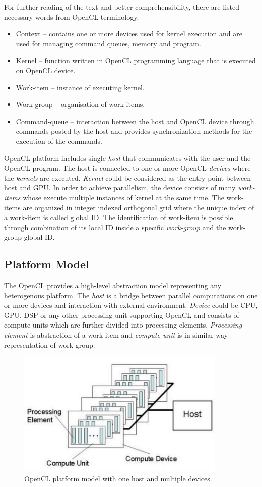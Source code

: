 For further reading of the text and better comprehensibility, there are
listed necessary words from OpenCL terminology\cite{opencl}.
\begin{itemize}
\item Context -- contains one or more devices used for kernel execution
and are used for managing command queues, memory and program.
\item Kernel -- function written in OpenCL programming language that 
is executed on OpenCL device. 
\item Work-item -- instance of executing kernel. 
\item Work-group -- organisation of work-items. 
\item Command-queue -- interaction between the host and OpenCL
device through commands posted by the host and provides synchronization
methods for the execution of the commands.
\end{itemize}

OpenCL platform includes single \textit{host} that communicates with the user
and the OpenCL program. The host is connected to one or more
OpenCL \textit{devices} where the \textit{kernels} are executed. 
\textit{Kernel} could be considered as the entry point between host and
GPU. In order to achieve parallelism, the device consists of many 
\textit{work-items} whose execute multiple instances of kernel at the same 
time. The work-items are organized in integer indexed orthogonal grid where 
the unique index of a work-item is called global ID. The identification
of work-item is possible through combination of its local ID inside a specific
\textit{work-group} and the work-group global ID.

\subsection{Platform Model}
The OpenCL provides a high-level abstraction model representing any heterogenous
platform. The \textit{host} is a bridge between parallel computations on one or
more devices and interaction with external environment. \textit{Device} could be
CPU, GPU, DSP or any other processing unit supporting OpenCL and consists
of compute units which are further divided into processing elements. 
\textit{Processing element} is abstraction of a work-item and 
\textit{compute unit} is in similar way representation of work-group.

\begin{figure}[H]
\centering
\includegraphics[width=10cm]{fig/opencl_platform_model.jpg}
\caption{OpenCL platform model with one host and multiple devices\cite{opencl}.}
\label{oclpm}
\end{figure}


